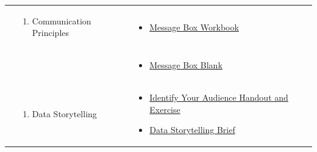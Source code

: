 \documentclass[
]{book}
\providecommand{\tightlist}{%
  \setlength{\itemsep}{0pt}\setlength{\parskip}{0pt}}
\begin{document}
\begin{longtable}[]{@{}lll@{}}
\begin{minipage}[t]{0.15\columnwidth}
\end{minipage} & \begin{minipage}[t]{0.34\columnwidth}\raggedright
\begin{enumerate}
\def\labelenumi{\arabic{enumi}.}
\tightlist
\item
  Communication Principles
\end{enumerate}\strut
\end{minipage} & \begin{minipage}[t]{0.42\columnwidth}\raggedright
\begin{itemize}
\tightlist
\item
  \href{https://www.compassscicomm.org/wp-content/uploads/2020/05/The-Message-Box-Workbook.pdf}{Message Box Workbook}
\end{itemize}\strut
\end{minipage}\tabularnewline
\begin{minipage}[t]{0.15\columnwidth}\raggedright
\strut
\end{minipage} & \begin{minipage}[t]{0.34\columnwidth}\raggedright
\strut
\end{minipage} & \begin{minipage}[t]{0.42\columnwidth}\raggedright
\begin{itemize}
\tightlist
\item
  \href{files/Message-Box-Blank.pdf}{Message Box Blank}
\end{itemize}\strut
\end{minipage}\tabularnewline
\begin{minipage}[t]{0.15\columnwidth}\raggedright
\strut
\end{minipage} & \begin{minipage}[t]{0.34\columnwidth}\raggedright
\begin{enumerate}
\def\labelenumi{\arabic{enumi}.}
\setcounter{enumi}{1}
\tightlist
\item
  Data Storytelling
\end{enumerate}\strut
\end{minipage} & \begin{minipage}[t]{0.42\columnwidth}\raggedright
\begin{itemize}
\tightlist
\item
  \href{files/M4S2_Data_Storytelling_Audience_Handout_Exercise.pdf}{Identify Your Audience Handout and Exercise}
\item
  \href{files/M4S2_Data_Storytelling_Brief.pdf}{Data Storytelling Brief}
\end{itemize}\strut

\end{minipage}
\end{longtable}
\end{document}
